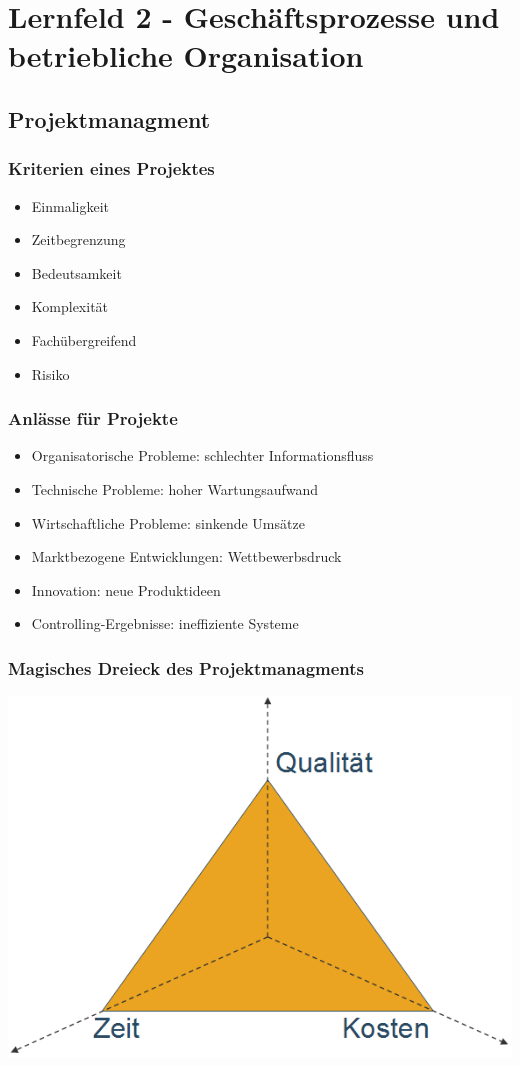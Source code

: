 \section{Lernfeld 2 - Geschäftsprozesse und betriebliche Organisation}

\subsection{Projektmanagment}

\subsubsection{Kriterien eines Projektes}
\begin{itemize}
	\item Einmaligkeit
	\item Zeitbegrenzung
	\item Bedeutsamkeit
	\item Komplexität
	\item Fachübergreifend
	\item Risiko
\end{itemize}

\subsubsection{Anlässe für Projekte}
\begin{itemize}
	\item Organisatorische Probleme: schlechter Informationsfluss
	\item Technische Probleme: hoher Wartungsaufwand
	\item Wirtschaftliche Probleme: sinkende Umsätze
	\item Marktbezogene Entwicklungen: Wettbewerbsdruck
	\item Innovation: neue Produktideen
	\item Controlling-Ergebnisse: ineffiziente Systeme
\end{itemize}

\subsubsection{Magisches Dreieck des Projektmanagments}

\includegraphics[scale=0.4]{pictures/lf02-pic/lf02-projekt-dreieck.png}

